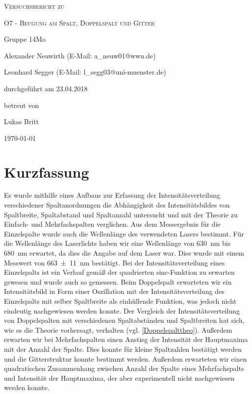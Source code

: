 \documentclass[
	a4paper,
	12pt,
	pagesize,
	ngerman
]{scrartcl}
\begin{document}
	
	\begin{titlepage}
		\centering
		{\scshape\LARGE Versuchsbericht zu \par}
		\vspace{1cm}
		{\scshape\huge O7 - Beugung am Spalt, Doppelspalt und Gitter \par}
		\vspace{2.5cm}
		{\LARGE Gruppe 14Mo \par}
		\vspace{0.5cm}
		
		{\large Alexander Neuwirth (E-Mail: a\_neuw01@wwu.de) \par}
		{\large Leonhard Segger (E-Mail: l\_segg03@uni-muenster.de) \par}
		\vfill
		
		durchgeführt am 23.04.2018\par
		betreut von\par
		{\large Lukas Britt}
		
		\vfill
		
		{\large \today\par}
	\end{titlepage}
	\tableofcontents
	\newpage

	\section{Kurzfassung}
	
	Es wurde mithilfe eines Aufbaus zur Erfassung der Intensitätsverteilung verschiedener Spaltanordnungen die Abhängigkeit des Intensitätsbildes von Spaltbreite, Spaltabstand und Spaltanzahl untersucht und mit der Theorie zu Einfach- und Mehrfachspalten verglichen.
	Aus dem Messergebnis für die Einzelspalte wurde auch die Wellenlänge des verwendeten Lasers bestimmt.
	Für die Wellenlänge des Laserlichts haben wir eine Wellenlänge von \SI{630}{\nano \meter} bis \SI{680}{\nano \meter} erwartet, da dies die Angabe auf dem Laser war.
	Dies wurde mit einem Messwert von \SI{663 \pm 11}{nm} bestätigt.
	Bei der Intensitätsverteilung eines Einzelspalts ist ein Verlauf gemäß der quadrierten sinc-Funktion zu erwarten gewesen und wurde auch so gemessen.
	Beim Doppelspalt erwarteten wir ein Intensitätsbild in Form einer Oszillation mit der Intensitätsverteilung des Einzelspalts mit selber Spaltbreite als einhüllende Funktion, was jedoch nicht eindeutig nachgewiesen werden konnte.
	Der Vergleich der Intensitätsverteilung von Doppelspalten mit verschiedenen Spaltabständen und Spaltbreiten hat sich, wie es die Theorie vorhersagt, verhalten (vgl. \cref{Doppelspalttheo}). 
	Außerdem erwarten wir bei Mehrfachspalten einen Anstieg der Intensität der Hauptmaxima mit der Anzahl der Spalte.
	Dies konnte für kleine Spaltzahlen bestätigt werden und die Gitterstruktur konnte bestimmt werden.
	Außerdem erwarteten wir einen quadratischen Zusammenhang zwischen Anzahl der Spalte eines Mehrfachspalts und Intensität der Hauptmaxima, der aber experimentell nicht nachgewiesen werden konnte.
	
\end{document}
